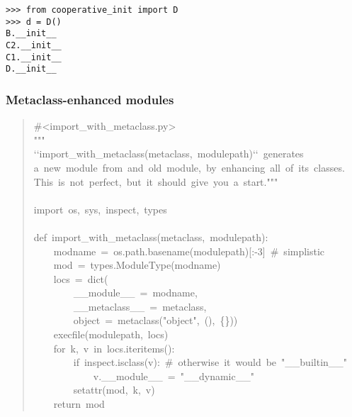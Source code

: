 \documentclass[10pt,a4paper,english]{article}
\begin{document}
\begin{verbatim}>>> from cooperative_init import D
>>> d = D()
B.__init__
C2.__init__
C1.__init__
D.__init__\end{verbatim}



\hypertarget{metaclass-enhanced-modules}{}
\subsubsection*{Metaclass-enhanced modules}
\begin{quote}{\ttfamily \raggedright \noindent
{\#}<import{\_}with{\_}metaclass.py>~\\
"{}"{}"~\\
`{}`import{\_}with{\_}metaclass(metaclass,~modulepath)`{}`~generates~\\
a~new~module~from~and~old~module,~by~enhancing~all~of~its~classes.~\\
This~is~not~perfect,~but~it~should~give~you~a~start."{}"{}"~\\
~\\
import~os,~sys,~inspect,~types~\\
~\\
def~import{\_}with{\_}metaclass(metaclass,~modulepath):~\\
~~~~modname~=~os.path.basename(modulepath){[}:-3]~{\#}~simplistic~\\
~~~~mod~=~types.ModuleType(modname)~\\
~~~~locs~=~dict(~\\
~~~~~~~~{\_}{\_}module{\_}{\_}~=~modname,~\\
~~~~~~~~{\_}{\_}metaclass{\_}{\_}~=~metaclass,~\\
~~~~~~~~object~=~metaclass("object",~(),~{\{}{\}}))~\\
~~~~execfile(modulepath,~locs)~\\
~~~~for~k,~v~in~locs.iteritems():~\\
~~~~~~~~if~inspect.isclass(v):~{\#}~otherwise~it~would~be~"{\_}{\_}builtin{\_}{\_}"~\\
~~~~~~~~~~~~v.{\_}{\_}module{\_}{\_}~=~"{\_}{\_}dynamic{\_}{\_}"~\\
~~~~~~~~setattr(mod,~k,~v)~\\
~~~~return~mod
}\end{quote}
\end{document}
